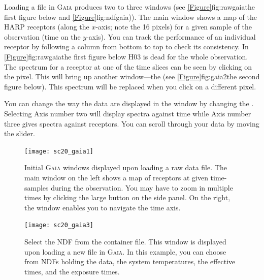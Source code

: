 \documentclass[11pt,oneside,chapters]{starlink}
\begin{document}
Loading a file in \textsc{Gaia} produces two to three windows (see
\cref{Figure}{fig:rawgaia}{the first figure below} and
\cref{Figure}{fig:ndfgaia})). The main window
shows a map of the HARP receptors (along the $x$-axis; note the 16
pixels) for a given sample of the observation (time on the $y$-axis).
You can track the performance of an individual receptor by following a
column from bottom to top to check its consistency. In
\cref{Figure}{fig:rawgaia}{the first figure below} H03 is dead for the
whole observation. The spectrum for a receptor at one of the time
slices can be seen by clicking on the pixel. This will bring up
another window---the  (see
\cref{Figure}{fig:gaia2}{the second figure below}). This spectrum will
be replaced when you click on a different pixel.

You can change the way the data are displayed in the  window by changing the .
Selecting Axis number two will display spectra against time while Axis
number three gives spectra against receptors. You can scroll through
your data by moving the  slider.

\begin{figure}[h!]
\begin{center}
\texttt{[image: sc20\_gaia1]}
\caption[\gaia\ main window.]{\label{fig:rawgaia}
  Initial \textsc{Gaia} windows displayed upon loading a raw
  data file. The main window on the left shows a map of receptors at
  given time-samples during the observation. You may have to zoom in
  multiple times by clicking the large  button on the side
  panel. On the right, the 
  window enables you to navigate the time axis.}
\end{center}
\end{figure}


\begin{figure}[h!]
\begin{center}
\texttt{[image: sc20\_gaia3]}
\caption[\gaia\ select NDF in container file]{\label{fig:ndfgaia}
  Select the NDF from the container file.  This window is displayed upon
  loading a new file in \textsc{Gaia}.  In this example, you can choose
  from NDFs holding the data, the system temperatures, the effective
  times, and the exposure times.}
\end{center}
\end{figure}
\end{document}
